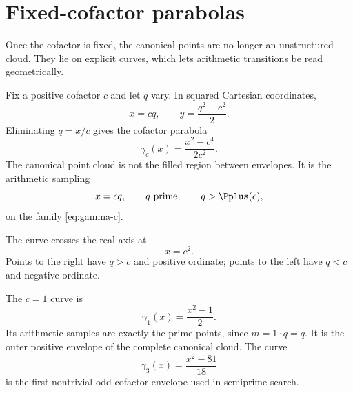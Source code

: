 \section{Fixed-cofactor parabolas}
\label{sec:cofactor-curves}

Once the cofactor is fixed, the canonical points are no longer an unstructured cloud.  They lie on explicit curves, which lets arithmetic transitions be read geometrically.

Fix a positive cofactor $c$ and let $q$ vary.  In squared Cartesian coordinates,
\begin{equation}
 x=cq,
 \qquad
 y=\frac{q^2-c^2}{2}.
 \label{eq:curve-param}
\end{equation}
Eliminating $q=x/c$ gives the cofactor parabola
\begin{equation}
 \boxed{
 \gamma_c(x)
 =\frac{x^2-c^4}{2c^2}.
 }
 \label{eq:gamma-c}
\end{equation}
The canonical point cloud is not the filled region between envelopes.  It is the arithmetic sampling
\begin{equation}
 x=cq,
 \qquad
 q\text{ prime},
 \qquad
 q>\Pplus(c),
 \label{eq:curve-sampling}
\end{equation}
on the family \cref{eq:gamma-c}.

The curve crosses the real axis at
\begin{equation}
 x=c^2.
 \label{eq:curve-axis-cross}
\end{equation}
Points to the right have $q>c$ and positive ordinate; points to the left have $q<c$ and negative ordinate.

The $c=1$ curve is
\begin{equation}
 \gamma_1(x)=\frac{x^2-1}{2}.
 \label{eq:prime-curve}
\end{equation}
Its arithmetic samples are exactly the prime points, since $m=1\cdot q=q$.  It is the outer positive envelope of the complete canonical cloud.  The curve
\begin{equation}
 \gamma_3(x)=\frac{x^2-81}{18}
 \label{eq:three-curve}
\end{equation}
is the first nontrivial odd-cofactor envelope used in semiprime search.

